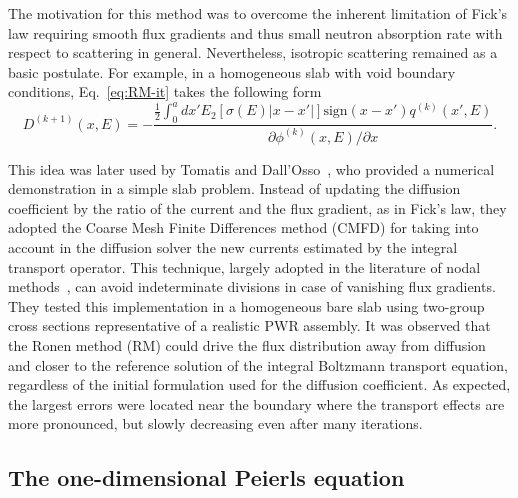 The motivation for this method was to overcome the inherent limitation of Fick's law requiring smooth flux gradients and thus small neutron absorption rate with respect to scattering in general. Nevertheless, isotropic scattering remained as a basic postulate.
For example, in a homogeneous slab with void boundary conditions, Eq.~\eqref{eq:RM-it} takes the following form~\cite{Ronen-2004} 
\begin{equation}\label{eq:RM-it-1D-slab}
D^{(k+1)}(x,E) = -\frac{\displaystyle \frac{1}{2}\int_0^a dx' E_2[\sigma(E)\lvert
	x-x'\rvert]\text{sign}(x-x')q^{(k)}(x',E)}
{\partial \phi^{(k)}(x,E)/\partial x}.
\end{equation}

This idea was later used by Tomatis and Dall'Osso~\cite{Tomatis-2011}, who provided a numerical demonstration in a simple slab problem. Instead of updating the diffusion coefficient by the ratio of the current and the flux gradient, as in Fick's law, they adopted the Coarse Mesh Finite Differences method (CMFD) for taking into account in the diffusion solver the new currents estimated by the integral transport operator. 
%
%
This technique, largely adopted in the literature of nodal methods~\cite{Smith-1983,Lawrence-1986}, can avoid indeterminate divisions in case of vanishing flux gradients. They tested this implementation in a homogeneous bare slab using two-group cross sections representative of a realistic PWR assembly. It was observed that the Ronen method (RM) could drive the flux distribution away from diffusion and closer to the reference solution of the integral Boltzmann transport equation, regardless of the initial formulation used for the diffusion coefficient. As expected, the largest errors were located near the boundary where the transport effects are more pronounced, but slowly decreasing even after many iterations.%

%
\subsection{The one-dimensional Peierls equation}
\label{sec:Peierls}

